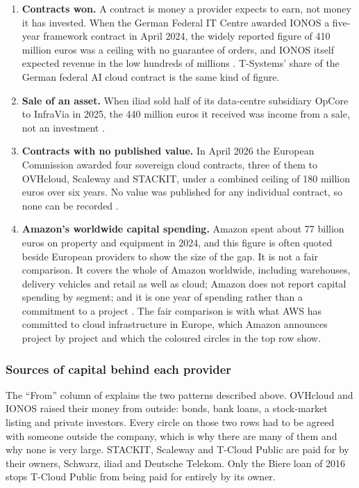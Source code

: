 \begin{enumerate}
  \item \textbf{Contracts won.} A contract is money a provider expects to earn,
  not money it has invested. When the German Federal IT Centre awarded IONOS a
  five-year framework contract in April 2024, the widely reported figure of 410
  million euros was a ceiling with no guarantee of orders, and IONOS itself
  expected revenue in the low hundreds of millions \cite{IONOS_ITZBund_2024}.
  T-Systems' share of the German federal \acs{AI} cloud contract is the same kind
  of figure.

  \item \textbf{Sale of an asset.} When iliad sold half of its data-centre
  subsidiary OpCore to InfraVia in 2025, the 440 million euros it received was
  income from a sale, not an investment \cite{Iliad_Results_FY2025}.

  \item \textbf{Contracts with no published value.} In April 2026 the European
  Commission awarded four sovereign cloud contracts, three of them to OVHcloud,
  Scaleway and STACKIT, under a combined ceiling of 180 million euros over six
  years. No value was published for any individual contract, so none can be
  recorded \cite{EC_SovereignCloudTender_2026}.

  \item \textbf{Amazon's worldwide capital spending.} Amazon spent about 77
  billion euros on property and equipment in 2024, and this figure is often
  quoted beside European providers to show the size of the gap. It is not a
  fair comparison. It covers the whole of Amazon worldwide, including warehouses,
  delivery vehicles and retail as well as cloud; Amazon does not report capital
  spending by segment; and it is one year of spending rather than a commitment
  to a project \cite{Amazon_10K_2025}. The fair comparison is with what
  \acs{AWS} has committed to cloud infrastructure in Europe, which Amazon
  announces project by project and which the coloured circles in the top row
  show.
\end{enumerate}

\subsubsection*{Sources of capital behind each provider}

The \enquote{From} column of  explains the two patterns
described above. OVHcloud and IONOS raised their money from outside: bonds, bank
loans, a stock-market listing and private investors. Every circle on those two rows
had to be agreed with someone outside the company, which is why there are many of
them and why none is very large. STACKIT, Scaleway and T-Cloud Public are paid for
by their owners, Schwarz, iliad and Deutsche Telekom. Only the Biere loan of 2016
stops T-Cloud Public from being paid for entirely by its owner.

